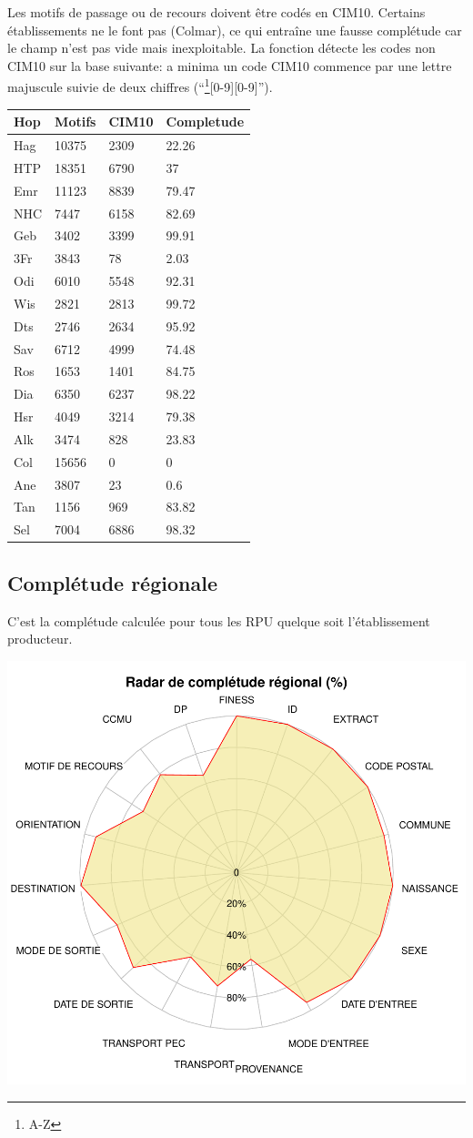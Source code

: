 \documentclass[]{article}
\let\rmarkdownfootnote\footnote%
\def\footnote{\protect\rmarkdownfootnote}
\begin{document}
Les motifs de passage ou de recours doivent être codés en CIM10.
Certains établissements ne le font pas (Colmar), ce qui entraîne une
fausse complétude car le champ n'est pas vide mais inexploitable. La
fonction détecte les codes non CIM10 sur la base suivante: a minima un
code CIM10 commence par une lettre majuscule suivie de deux chiffres
(``\footnote{A-Z}{[}0-9{]}{[}0-9{]}'').

\begin{longtable}[c]{@{}llll@{}}
\toprule
Hop & Motifs & CIM10 & Completude\tabularnewline
\midrule
\endhead
Hag & 10375 & 2309 & 22.26\tabularnewline
HTP & 18351 & 6790 & 37\tabularnewline
Emr & 11123 & 8839 & 79.47\tabularnewline
NHC & 7447 & 6158 & 82.69\tabularnewline
Geb & 3402 & 3399 & 99.91\tabularnewline
3Fr & 3843 & 78 & 2.03\tabularnewline
Odi & 6010 & 5548 & 92.31\tabularnewline
Wis & 2821 & 2813 & 99.72\tabularnewline
Dts & 2746 & 2634 & 95.92\tabularnewline
Sav & 6712 & 4999 & 74.48\tabularnewline
Ros & 1653 & 1401 & 84.75\tabularnewline
Dia & 6350 & 6237 & 98.22\tabularnewline
Hsr & 4049 & 3214 & 79.38\tabularnewline
Alk & 3474 & 828 & 23.83\tabularnewline
Col & 15656 & 0 & 0\tabularnewline
Ane & 3807 & 23 & 0.6\tabularnewline
Tan & 1156 & 969 & 83.82\tabularnewline
Sel & 7004 & 6886 & 98.32\tabularnewline
\bottomrule
\end{longtable}

\subsection{Complétude régionale}\label{completude-regionale}

C'est la complétude calculée pour tous les RPU quelque soit
l'établissement producteur.

\includegraphics{completude_files/figure-latex/comp_regionale-1.pdf}
\end{document}
